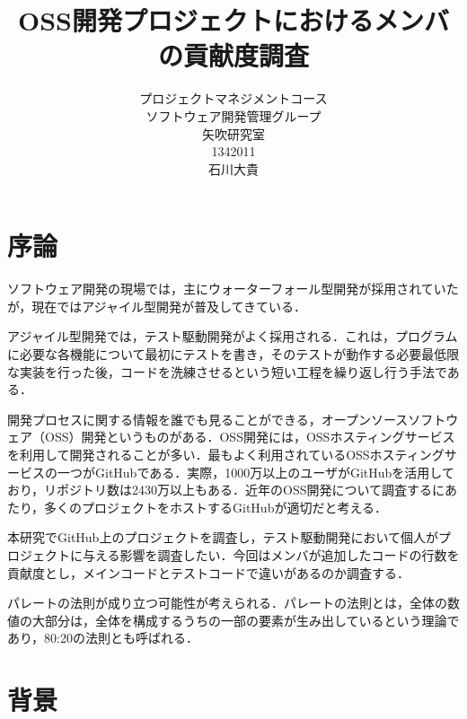 \title{OSS開発プロジェクトにおけるメンバの貢献度調査}
\author{プロジェクトマネジメントコース\\
ソフトウェア開発管理グループ\\
矢吹研究室\\
1342011\\
石川大貴}
\date{}

\maketitle



\tableofcontents%

\chapter{序論}

ソフトウェア開発の現場では，主にウォーターフォール型開発が採用されていたが，現在ではアジャイル型開発が普及してきている．

アジャイル型開発では，テスト駆動開発がよく採用される．これは，プログラムに必要な各機能について最初にテストを書き，そのテストが動作する必要最低限な実装を行った後，コードを洗練させるという短い工程を繰り返し行う手法である．

開発プロセスに関する情報を誰でも見ることができる，オープンソースソフトウェア（OSS）開発というものがある．OSS開発には，OSSホスティングサービスを利用して開発されることが多い．最もよく利用されているOSSホスティングサービスの一つがGitHubである．実際，1000万以上のユーザがGitHubを活用しており，リポジトリ数は2430万以上もある．近年のOSS開発について調査するにあたり，多くのプロジェクトをホストするGitHubが適切だと考える．

本研究でGitHub上のプロジェクトを調査し，テスト駆動開発において個人がプロジェクトに与える影響を調査したい．今回はメンバが追加したコードの行数を貢献度とし，メインコードとテストコードで違いがあるのか調査する．

パレートの法則が成り立つ可能性が考えられる．パレートの法則とは，全体の数値の大部分は，全体を構成するうちの一部の要素が生み出しているという理論であり，80:20の法則とも呼ばれる．


\chapter{背景}
